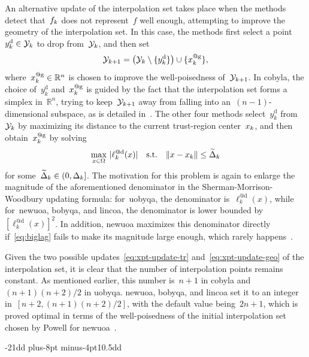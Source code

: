 \documentclass[smallextended]{svjour3}
\makeatletter
\newcommand{\abs}[2][]{#1\lvert#2#1\rvert}
\newcommand{\norm}[2][]{#1\lVert#2#1\rVert}
\newcommand{\set}[2][]{#1\{#2#1\}}
\newcommand{\R}{\mathbb{R}}
\newcommand{\drop}{{\text{d}}}
\newcommand{\geo}{{\text{g}}}
\newcommand{\st}{\text{s.t.}}
\newcommand{\fset}{\Omega}
\newcommand{\iter}[1][k]{x\ifthenelse{\equal{#1}{}}{}{_{#1}}}
\newcommand{\objm}[1][k]{\obj\ifthenelse{\equal{#1}{}}{}{_{#1}}}
\newcommand{\obj}{f}
\newcommand{\radalt}[1][k]{\widetilde{\Delta}\ifthenelse{\equal{#1}{}}{}{_{#1}}}
\newcommand{\rad}[1][k]{\Delta\ifthenelse{\equal{#1}{}}{}{_{#1}}}
\newcommand{\xpt}[1][k]{\mathcal{Y}\ifthenelse{\equal{#1}{}}{}{_{#1}}}
\def\subsection{\@startsection{subsection}{2}{\z@}%
    {-21dd plus-8pt minus-4pt}{10.5dd}
    {\normalsize\bfseries}}
\makeatother
\begin{document}
An alternative update of the interpolation set takes place when the methods detect that~$\objm$ does not represent~$\obj$ well enough, attempting to improve the geometry of the interpolation set.
In this case, the methods first select a point~$y_k^{\drop} \in \xpt$ to drop from~$\xpt$, and then set
\begin{equation}
    \label{eq:xpt-update-geo}
    \xpt[k + 1] = \big(\xpt \setminus \set{y_k^{\drop}}\big) \cup \set{\iter^{@\geo}},
\end{equation}
where~$\iter^{@\geo} \in \R^n$ is chosen to improve the well-poisedness of~$\xpt[k + 1]$.
In \gls{cobyla}, the choice of~$y_k^{\drop}$ and~$\iter^{@\geo}$ is guided by the fact that the interpolation set forms a simplex in~$\R^n$, trying to keep~$\xpt[k+1]$ away from falling into an~$(n-1)$-dimensional subspace, as is detailed in~\cite[Equations~(15)--(17)]{Powell_1994}.
The other four methods select~$y_k^{\drop}$ from~$\xpt$ by maximizing its distance to the current trust-region center~$\iter$, and then obtain~$\iter^{@\geo}$ by solving
\begin{equation}
    \label{eq:biglag}
        \max_{x \in \fset} ~ \abs{\ell_k^{@\drop}(x)} \quad \st \quad \norm{x - \iter} \le \radalt
\end{equation}
for some~$\radalt \in (0, \rad]$.
The motivation for this problem is again to enlarge the magnitude of the aforementioned denominator in the Sherman-Morrison-Woodbury updating formula: for~\gls{uobyqa}, the denominator is~$\ell_k^{@\drop}(x)$, while for~\gls{newuoa}, \gls{bobyqa}, and \gls{lincoa}, the denominator is lower bounded by~$[\ell_k^{@\drop}(x)]^2$.
In addition, \gls{newuoa} maximizes this denominator directly if~\eqref{eq:biglag} fails to make its magnitude large enough, which rarely happens~\cite[\S~6]{Powell_2006}.

Given the two possible updates~\eqref{eq:xpt-update-tr} and~\eqref{eq:xpt-update-geo} of the interpolation set, it is clear that the number of interpolation points remains constant.
As mentioned earlier, this number is~$n+1$ in \gls{cobyla} and~$(n+1)(n+2)/2$ in \gls{uobyqa}.
\Gls{newuoa}, \gls{bobyqa}, and \gls{lincoa} set it to an integer in~$[n+2, (n+1)(n+2)/2]$, with the default value being~$2n+1$, which is proved optimal in terms of the well-poisedness of the initial interpolation set chosen by Powell for \gls{newuoa}~\cite{Ragonneau_Zhang_2023a}.

\subsection{}
\label{ssec:cobyla}
\end{document}
